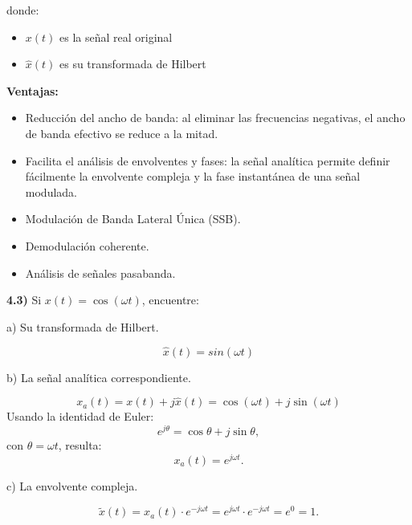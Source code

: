 donde:
\begin{itemize}
    \item \( x(t) \) es la señal real original
    \item \( \hat{x}(t) \) es su transformada de Hilbert
\end{itemize}

\noindent \textbf{Ventajas:}
\begin{itemize}
    \item Reducción del ancho de banda: al eliminar las frecuencias negativas, el ancho de banda efectivo se reduce a la mitad.
    \item Facilita el análisis de envolventes y fases: la señal analítica permite definir fácilmente la envolvente compleja y la fase instantánea de una señal modulada.
    \item Modulación de Banda Lateral Única (SSB).
    \item Demodulación coherente.
    \item Análisis de señales pasabanda.
\end{itemize}
\bigskip 

\noindent \textbf{4.3)} Si \(x(t) = \cos(\omega t)\), encuentre:\par
\bigskip

\noindent a) Su transformada de Hilbert.\par
\[
\hat{x}(t) = sin(\omega t)
\]

\noindent b) La señal analítica correspondiente. \par
\[
x_a(t) = x(t) + j \hat{x}(t) = \cos(\omega t) + j \sin(\omega t)
\]
Usando la identidad de Euler:
\[
e^{j\theta} = \cos\theta + j\sin\theta,
\]
con \(\theta = \omega t\), resulta:
\[
x_a(t) = e^{j\omega t}.
\]


\noindent c) La envolvente compleja.\par
\[
\tilde{x}(t) = x_a(t) \cdot e^{-j\omega t} = e^{j\omega t} \cdot e^{-j\omega t} = e^{0} = 1.
\]
